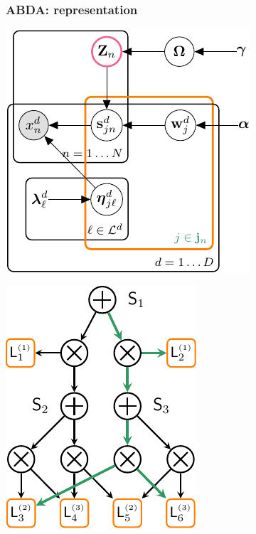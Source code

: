 \documentclass[xcolor={usenames,dvipsnames,svgnames}, compress, aspectratio=169, 11pt]{beamer}
\begin{document}
\begin{frame}[t, htt=bgrey2]
  \frametitle{ABDA: representation}

  \large
  \begin{minipage}[t]{0.3\linewidth}
    \vspace{15pt}
    \includegraphics[width=.99\linewidth]{figures/joint-param-hspn-crop}
  \end{minipage}\hfill\begin{minipage}[t]{0.3\linewidth}
    \vspace{20pt}
    \includegraphics[width=.7\linewidth]{figures/hspn}

\end{minipage}
\end{frame}
\end{document}
